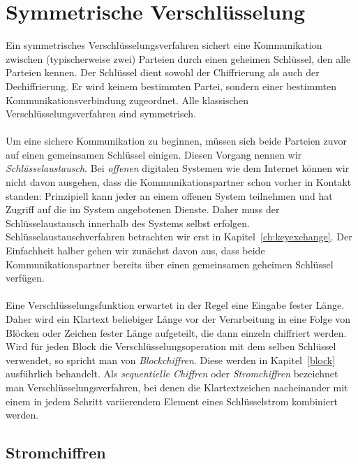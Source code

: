 \chapter{Symmetrische Verschlüsselung}
\label{symenc}

Ein symmetrisches Verschlüsselungsverfahren sichert eine Kommunikation zwischen (typischerweise zwei) Parteien durch einen geheimen Schlüssel, den alle Parteien kennen. Der Schlüssel dient sowohl der Chiffrierung als auch der Dechiffrierung. Er wird keinem bestimmten Partei, sondern einer bestimmten Kommunikationsverbindung zugeordnet. Alle klassischen Verschlüsselungsverfahren sind symmetrisch.\\ \ \\
Um eine sichere Kommunikation zu beginnen, müssen sich beide Parteien zuvor auf einen gemeinsamen Schlüssel einigen. Diesen Vorgang nennen wir \emph{Schlüsselaustausch}. Bei \emph{offenen} digitalen Systemen wie dem Internet können wir nicht davon ausgehen, dass die Kommunikationspartner schon vorher in Kontakt standen: Prinzipiell kann jeder an einem offenen System teilnehmen und hat Zugriff auf die im System angebotenen Dienste. Daher muss der
Schlüsselaustausch innerhalb des Systems selbst erfolgen. Schlüsselaustauschverfahren betrachten wir erst  in Kapitel~\ref{ch:keyexchange}. Der Einfachheit halber gehen wir zunächst davon aus, dass beide Kommunikationspartner bereits über einen gemeinsamen geheimen Schlüssel verfügen.\\ \ \\
Eine Verschlüsselungsfunktion erwartet in der Regel eine Eingabe fester Länge. Daher wird ein Klartext beliebiger Länge vor der Verarbeitung in eine Folge von Blöcken oder Zeichen fester Länge aufgeteilt, die dann einzeln chiffriert werden. Wird für jeden Block die Verschlüsselungsoperation mit dem selben Schlüssel verwendet, so spricht man von \emph{Blockchiffren}. Diese werden in Kapitel~\ref{block} ausführlich behandelt. Als \emph{sequentielle Chiffren} oder \emph{Stromchiffren} bezeichnet man Verschlüsselungsverfahren, bei denen die Klartextzeichen nacheinander mit einem in jedem Schritt variierendem Element eines Schlüsselstrom kombiniert werden.

\section{Stromchiffren}

